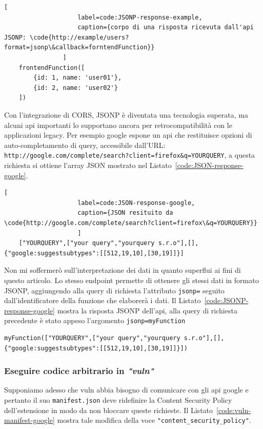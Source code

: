 \documentclass{sapthesis}
\newcommand{\code}[1]{\texttt{#1}}
\newcommand{\refCode}[1]{Listato~\ref{#1}}
\newcommand{\vuln}{\textit{"vuln"}}
\newcommand{\manifest}{\code{manifest.json} }
\begin{document}
                \begin{lstlisting}[
                    label=code:JSONP-response-example,
                    caption={corpo di una risposta ricevuta dall'api JSONP: \code{http://example/users?format=jsonp\&callback=forntendFunction}}
                ]
    frontendFunction([
        {id: 1, name: 'user01'},
        {id: 2, name: 'user02'}
    ])
                \end{lstlisting}

                Con l'integrazione di CORS, JSONP è diventata una tecnologia superata, ma alcuni api importanti
                lo supportano ancora per retrocompatibilità con le applicazioni legacy. Per esempio google
                espone un api che restituisce opzioni di auto-completamento di query, accessibile dall'URL:
                \code{http://google.com/complete/search?client=firefox\&q=YOURQUERY}, a questa richiesta si
                ottiene l'array JSON mostrato nel \refCode{code:JSON-response-google}.

                \begin{lstlisting}[
                    label=code:JSON-response-google, 
                    caption={JSON resituito da \code{http://google.com/complete/search?client=firefox\&q=YOURQUERY}}
                    ]
    ["YOURQUERY",["your query","yourquery s.r.o"],[],{"google:suggestsubtypes":[[512,19,10],[30,19]]}]
                \end{lstlisting}

                Non mi soffermerò sull'interpretazione dei dati in quanto superflui ai fini di questo articolo.
                Lo stesso endpoint permette di ottenere gli stessi dati in formato JSONP, aggiungendo alla query
                di richiesta l'attributo \code{jsonp=} seguito dall'identificatore della funzione che elaborerà
                i dati. Il \refCode{code:JSONP-response-google} mostra la risposta JSONP dell'api, alla query di
                richiesta precedente è stato appeso l'argomento \code{jsonp=myFunction}

                \begin{lstlisting}[label=code:JSONP-response-google, caption={JSON resituito da \code{http://google.com/complete/search?client=firefox\&q=YOURQUERY\&jsonp=myFunction}}]
    myFunction(["YOURQUERY",["your query","yourquery s.r.o"],[],{"google:suggestsubtypes":[[512,19,10],[30,19]]}])
                \end{lstlisting}


                \subsubsection{Eseguire codice arbitrario in \vuln}
                Supponiamo adesso che vuln abbia bisogno di comunicare con gli api google e pertanto il
                suo \manifest{} deve ridefinire la Content Security Policy dell'estensione in modo da
                non bloccare queste richieste. Il \refCode{code:vuln-manifest-google} mostra tale
                modifica della voce \code{"content\_security\_policy"}.
\end{document}
